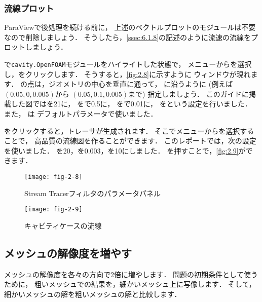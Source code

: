 \subsubsection{流線プロット}
\label{sssec:2.1.4.3}
ParaViewで後処理を続ける前に，
上述のベクトルプロットのモジュールは不要なので削除しましょう．
そうしたら，\autoref{ssec:6.1.8}の記述のように流速の流線をプロットしましょう．

で\texttt{cavity.OpenFOAM}モジュールをハイライトした状態で，
メニューからを選択し，をクリックします．
そうすると，\autoref{fig:2.8}に示すように
ウィンドウが現れます．
の点は，ジオメトリの中心を垂直に通って，
に沿うように (例えば$(0.05, 0, 0.005)$から
$(0.05, 0.1, 0.005)$まで) 指定しましょう．
このガイドに掲載した図ではを21に，
をで0.5に，
をで0.01に，
をという設定を行いました．
また， は
デフォルトパラメータで使いました．

をクリックすると，トレーサが生成されます．
そこでメニューからを選択することで，
高品質の流線図を作ることができます．
このレポートでは，次の設定を使いました．
を20，を0.003，を10にしました．
を押すことで，\autoref{fig:2.9}ができます．


\begin{figure}[ht]
 \texttt{[image: fig-2-8]}
 \caption{Stream Tracerフィルタのパラメータパネル}
 \label{fig:2.8}
\end{figure}


\begin{figure}[ht]
 \texttt{[image: fig-2-9]}
 \caption{キャビティケースの流線}
 \label{fig:2.9}
\end{figure}


\subsection{メッシュの解像度を増やす}
\label{ssec:2.1.5}
%
メッシュの解像度を各々の方向で2倍に増やします．
問題の初期条件として使うために，
粗いメッシュでの結果を，細かいメッシュ上に写像します．
そして，細かいメッシュの解を粗いメッシュの解と比較します．

